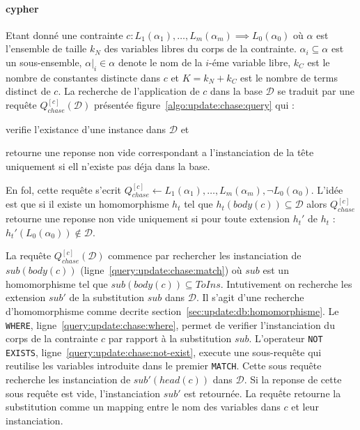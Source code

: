 \paragraph{\gls{cypher}}
Etant donné une contrainte $c : L_1(\alpha_1), \dots, L_m(\alpha_m) \implies L_0(\alpha_0)$ où $\alpha$ est l'ensemble de taille $k_N$ des variables libres du corps de la contrainte.
$\alpha_i \subseteq \alpha$ est un sous-ensemble, $\alpha|_i \in \alpha$ denote le nom de la $i$-éme variable libre, $k_C$ est le nombre de constantes distincte dans $c$ et $K = k_N + k_C$ est le nombre de terms distinct de $c$.
La recherche de l'application de $c$ dans la base $\mathcal{D}$ se traduit par une requête $Q_{chase}^{[c]}(\mathcal{D})$ présentée figure~\ref{algo:update:chase:query} qui :
\begin{enumerate*}[label=(\roman*)]
    \item verifie l'existance d'une instance dans $\mathcal{D}$ et
    \item retourne une reponse non vide correspondant a l'instanciation de la tête uniquement si ell n'existe pas déja dans la base.
\end{enumerate*}
En \gls{fol}, cette requête s'ecrit $Q_{chase}^{[c]} \gets L_1(\alpha_1), \dots, L_m(\alpha_m), \lnot L_0(\alpha_0)$.
L'idée est que si il existe un homomorphisme $h_t$ tel que $h_t(body(c)) \subseteq \mathcal{D}$ alors $Q_{chase}^{[c]}$ retourne une reponse non vide uniquement si pour toute extension $h_t'$ de $h_t$ : $h_t'(L_0(\alpha_0)) \notin \mathcal{D}$.

La requête $Q_{chase}^{[c]}(\mathcal{D})$ commence par rechercher les instanciation de $sub(body(c))$ (ligne~\ref{query:update:chase:match}) où $sub$ est un homomorphisme tel que $sub(body(c)) \subseteq ToIns$.
Intutivement on recherche les extension $sub'$ de la substitution $sub$ dans $\mathcal{D}$.
Il s'agit d'une recherche d'homomorphisme comme decrite section~\ref{sec:update:db:homomorphisme}.
Le \verb|WHERE|, ligne~\ref{query:update:chase:where}, permet de verifier l'instanciation du corps de la contrainte $c$ par rapport à la substitution $sub$.
L'operateur \verb|NOT EXISTS|, ligne~\ref{query:update:chase:not-exist}, execute une sous-requête qui reutilise les variables introduite dans le premier \verb|MATCH|.
Cette sous requête recherche les instanciation de $sub'(head(c))$ dans $\mathcal{D}$.
Si la reponse de cette sous requête est vide, l'instanciation $sub'$ est retournée.
La requête retourne la substitution comme un mapping entre le nom des variables dans $c$ et leur instanciation.

